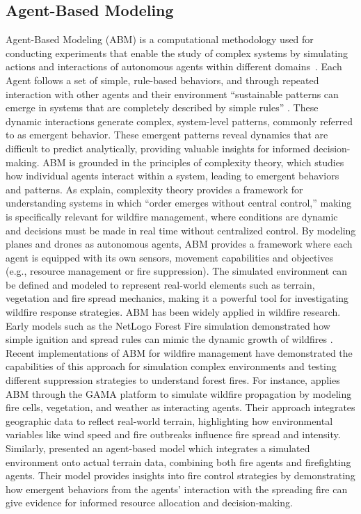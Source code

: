 \documentclass[twoside]{article}
\begin{document}
\subsection{Agent-Based Modeling}
Agent-Based Modeling (ABM) is a computational methodology used for conducting experiments that enable the study of complex systems by simulating actions and interactions of autonomous agents within different domains \citep{wilensky2015introduction}. Each Agent follows a set of simple, rule-based behaviors, and through repeated interaction with other agents and their environment “sustainable patterns can emerge in systems that are completely described by simple rules” \citep[p.5]{intro_to_abm}. These dynamic interactions generate complex, system-level patterns, commonly referred to as emergent behavior. These emergent patterns reveal dynamics that are difficult to predict analytically, providing valuable insights for informed decision-making.
ABM is grounded in the principles of complexity theory, which studies how individual agents interact within a system, leading to emergent behaviors and patterns. As \citet*{wilensky2015introduction} explain, complexity theory provides a framework for understanding systems in which ``order emerges without central control,'' making is specifically relevant for wildfire management, where conditions are dynamic and decisions must be made in real time without centralized control. By modeling planes and drones as autonomous agents, ABM provides a framework where each agent is equipped with its own sensors, movement capabilities and objectives (e.g., resource management or fire suppression). The simulated environment can be defined and modeled to represent real-world elements such as terrain, vegetation and fire spread mechanics, making it a powerful tool for investigating wildfire response strategies.
ABM has been widely applied in wildfire research. Early models such as the NetLogo Forest Fire simulation demonstrated how simple ignition and spread rules can mimic the dynamic growth of wildfires \citep{wilensky2015introduction}. Recent implementations of ABM for wildfire management have demonstrated the capabilities of this approach for simulation complex environments and testing different suppression strategies to understand forest fires. For instance, \citet*{MorenoEspino2025} applies ABM through the GAMA platform \citep{Gamma} to simulate wildfire propagation by modeling fire cells, vegetation, and weather as interacting agents. Their approach integrates geographic data to reflect real-world terrain, highlighting how environmental variables like wind speed and fire outbreaks influence fire spread and intensity. Similarly, \citet*{Dorrer_2020} presented an agent-based model which integrates a simulated environment onto actual terrain data, combining both fire agents and firefighting agents. Their model provides insights into fire control strategies by demonstrating how emergent behaviors from the agents' interaction with the spreading fire can give evidence for informed resource allocation and decision-making.
\end{document}
